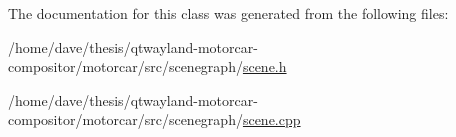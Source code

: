 The documentation for this class was generated from the following files\-:\begin{DoxyCompactItemize}
\item 
/home/dave/thesis/qtwayland-\/motorcar-\/compositor/motorcar/src/scenegraph/\hyperlink{scene_8h}{scene.\-h}\item 
/home/dave/thesis/qtwayland-\/motorcar-\/compositor/motorcar/src/scenegraph/\hyperlink{scene_8cpp}{scene.\-cpp}\end{DoxyCompactItemize}
